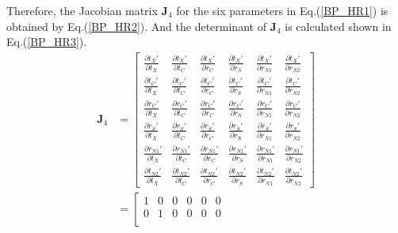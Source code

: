 \documentclass{bmcart}
\begin{document}
\begin{backmatter}
Therefore, the Jacobian matrix ${{\mathbf{J}}_4}$ for the six parameters in Eq.(\ref{BP_HR1}) is obtained by Eq.(\ref{BP_HR2}). And the determinant of ${{\mathbf{J}}_4}$ is calculated shown in Eq.(\ref{BP_HR3}).
\begin{equation}\label{BP_HR2}
\begin{aligned}
{{\mathbf{J}}_4} &= \left[ {\begin{array}{*{20}{c}}
  {\frac{{\partial {t_X}'}}{{\partial {t_X}}}}&{\frac{{\partial {t_X}'}}{{\partial {t_C}}}}&{\frac{{\partial {t_X}'}}{{\partial {r_C}}}}&{\frac{{\partial {t_X}'}}{{\partial {r_S}}}}&{\frac{{\partial {t_X}'}}{{\partial {r_{N1}}}}}&{\frac{{\partial {t_X}'}}{{\partial {r_{N2}}}}} \\ 
  {\frac{{\partial {t_C}'}}{{\partial {t_X}}}}&{\frac{{\partial {t_C}'}}{{\partial {t_C}}}}&{\frac{{\partial {t_C}'}}{{\partial {r_C}}}}&{\frac{{\partial {t_C}'}}{{\partial {r_S}}}}&{\frac{{\partial {t_C}'}}{{\partial {r_{N1}}}}}&{\frac{{\partial {t_C}'}}{{\partial {r_{N2}}}}} \\ 
  {\frac{{\partial {r_C}'}}{{\partial {t_X}}}}&{\frac{{\partial {r_C}'}}{{\partial {t_C}}}}&{\frac{{\partial {r_C}'}}{{\partial {r_C}}}}&{\frac{{\partial {r_C}'}}{{\partial {r_S}}}}&{\frac{{\partial {r_C}'}}{{\partial {r_{N1}}}}}&{\frac{{\partial {r_C}'}}{{\partial {r_{N2}}}}} \\ 
  {\frac{{\partial {r_S}'}}{{\partial {t_X}}}}&{\frac{{\partial {r_S}'}}{{\partial {t_C}}}}&{\frac{{\partial {r_S}'}}{{\partial {r_C}}}}&{\frac{{\partial {r_S}'}}{{\partial {r_S}}}}&{\frac{{\partial {r_S}'}}{{\partial {r_{N1}}}}}&{\frac{{\partial {r_S}'}}{{\partial {r_{N2}}}}} \\ 
  {\frac{{\partial {r_{N1}}'}}{{\partial {t_X}}}}&{\frac{{\partial {r_{N1}}'}}{{\partial {t_C}}}}&{\frac{{\partial {r_{N1}}'}}{{\partial {r_C}}}}&{\frac{{\partial {r_{N1}}'}}{{\partial {r_S}}}}&{\frac{{\partial {r_{N1}}'}}{{\partial {r_{N1}}}}}&{\frac{{\partial {r_{N1}}'}}{{\partial {r_{N2}}}}} \\ 
  {\frac{{\partial {t_{N2}}'}}{{\partial {t_X}}}}&{\frac{{\partial {t_{N2}}'}}{{\partial {t_C}}}}&{\frac{{\partial {t_{N2}}'}}{{\partial {r_C}}}}&{\frac{{\partial {t_{N2}}'}}{{\partial {r_S}}}}&{\frac{{\partial {t_{N2}}'}}{{\partial {r_{N1}}}}}&{\frac{{\partial {t_{N2}}'}}{{\partial {r_{N2}}}}} 
\end{array}} \right] \\&= \left[ {\begin{array}{*{20}{c}}
  1&0&0&0&0&0 \\ 
  0&1&0&0&0&0 \\ 

\end{array}}
\end{aligned}
\end{equation}
\end{backmatter}
\end{document}
